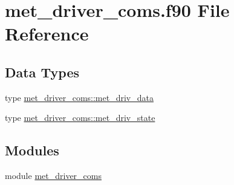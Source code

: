 \hypertarget{met__driver__coms_8f90}{}\section{met\+\_\+driver\+\_\+coms.\+f90 File Reference}
\label{met__driver__coms_8f90}
\subsection*{Data Types}
\begin{DoxyCompactItemize}
\item 
type \hyperlink{structmet__driver__coms_1_1met__driv__data}{met\+\_\+driver\+\_\+coms\+::met\+\_\+driv\+\_\+data}
\item 
type \hyperlink{structmet__driver__coms_1_1met__driv__state}{met\+\_\+driver\+\_\+coms\+::met\+\_\+driv\+\_\+state}
\end{DoxyCompactItemize}
\subsection*{Modules}
\begin{DoxyCompactItemize}
\item 
module \hyperlink{namespacemet__driver__coms}{met\+\_\+driver\+\_\+coms}
\end{DoxyCompactItemize}
